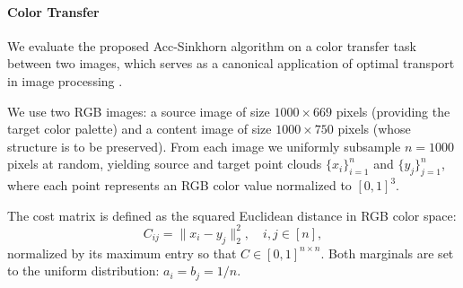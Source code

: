 \documentclass{article}
\theoremstyle{plain}
\theoremstyle{remark}
\begin{document}



\paragraph{Color Transfer}

We evaluate the proposed Acc-Sinkhorn algorithm on a color transfer
task between two images, which serves as a canonical application of
optimal transport in image processing \citep{reinhard2001color,
ferradans2014regularized}.


We use two RGB images: a source image of size $1000 \times 669$ pixels
(providing the target color palette) and a content image of size
$1000 \times 750$ pixels (whose structure is to be preserved). From each
image we uniformly subsample $n = 1000$ pixels at random, yielding source
and target point clouds
$\{x_i\}_{i=1}^n$ and
$\{y_j\}_{j=1}^n$,
where each point represents an RGB color value normalized to $[0, 1]^3$.


The cost matrix is defined as the squared Euclidean distance in RGB color
space:
\begin{equation}
    C_{ij} = \| x_i - y_j \|_2^2, \quad i, j \in [n],
\end{equation}
normalized by its maximum entry so that $C \in [0,1]^{n \times n}$.
Both marginals are set to the uniform distribution:
$a_i = b_j = 1/n$.
\end{document}
